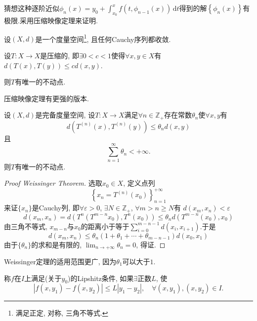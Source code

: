 猜想这种逐阶近似$\phi _{n}(x) = y_0 + \int _{x_0}^{x} f(t,\phi _{n-1}(x)) \, \mathrm{d} t$得到的解$\left\{ \phi _{n}(x) \right\}$有极限.采用压缩映像定理来证明.
\begin{theorem}
  设$\left( X,d \right)$是一个度量空间\footnote{满足正定, 对称, 三角不等式.}, 且任何Cauchy序列都收敛.

  设$T\colon X \to X$是压缩的, 即$\exists 0 < c < 1$使得$\forall x,y \in X$有$d\left( T(x), T(y) \right) \le c d(x,y)$.

  则$T$有唯一的不动点.
\end{theorem}
压缩映像定理有更强的版本.
\begin{theorem}[Weissinger]
  设$(X,d)$是完备度量空间, 设$T\colon X \to X$满足$\forall n \in \mathbb{Z}_{+}$存在常数$\theta_{n}$使$\forall x,y$有
  \begin{equation}
    d\left( T^{(n)}(x), T^{(n)}(y) \right) \le \theta_{n} d(x,y)
  \end{equation}
  且
  \begin{equation}
    \sum_{n=1}^{\infty } \theta_{n} < + \infty.
  \end{equation}
  则$T$有唯一的不动点.
\end{theorem}
\begin{proof}[Proof Weissinger Theorem]
  选取$x_0 \in X$, 定义点列
  \begin{equation}
  \left\{ x_n = T^{(n)}(x_0) \right\}_{n=1}^{+\infty }
  \end{equation}
  来证$\{ x_n \}$是Cauchy列, 即$\forall \varepsilon > 0$, $\exists N \in \mathbb{Z}_+$, $\forall m > n \ge N$有 $d(x_m, x_n) < \varepsilon$
  \begin{equation}
    d\left( x_m, x_n \right) = d \left( T^{n} (T^{m-n}x_0), T^{n} (x_0) \right) \le \theta_{n} d \left( T^{m-n}(x_0), x_0 \right)   \end{equation}
  由三角不等式, $x_{m-n}$与$x_0$的距离小于等于$\sum_{i=0}^{m-n-1}d(x_{i}, x_{i+1}) $.于是
  \begin{equation}
    d\left( x_m,x_n \right) \le \theta_{n} \left( 1 + \theta_1 + \cdots  + \theta_{m-n-1} \right) d\left( x_0, x_1 \right)
  \end{equation}
  由于$\{ \theta_{n} \}$的求和是有限的, $\lim _{n \to + \infty } \theta_{n} = 0$, 得证.
\end{proof}
Weissinger定理的适用范围更广, 因为$\theta_{1}$可以大于$1$.

\begin{definition}
  称$f$在$I$上满足(关于$y_0$)的Lipshitz条件, 如果$\exists \text{正数} L$, 使
  \begin{equation}
    \left| f(x,y_1) - f(x,y_2) \right| \le L \left| y_1 - y_2 \right|, \quad \forall (x,y_1), (x,y_2) \in I.
  \end{equation}
\end{definition}

